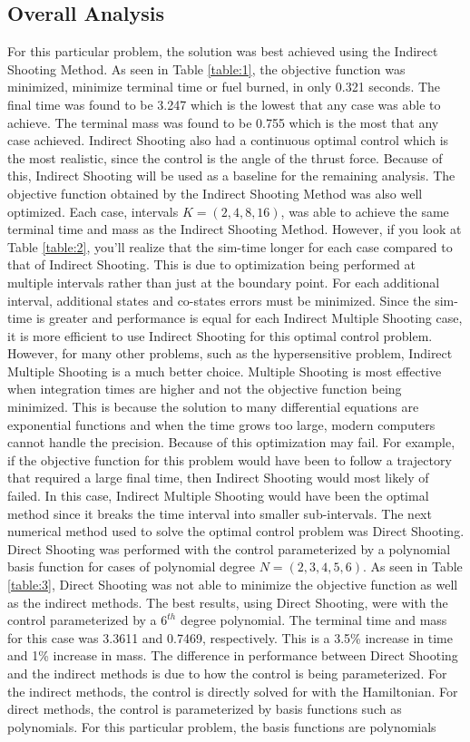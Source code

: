 \documentclass[]{article}
\begin{document}
\subsection{Overall Analysis}
For this particular problem, the solution was best achieved using the Indirect Shooting Method. As seen in Table \ref{table:1}, the objective function was minimized, minimize terminal time or fuel burned, in only 0.321 seconds. The final time was found to be 3.247 which is the lowest that any case was able to achieve. The terminal mass was found to be 0.755 which is the most that any case achieved. Indirect Shooting also had a continuous optimal control which is the most realistic, since the control is the angle of the thrust force. Because of this, Indirect Shooting will be used as a baseline for the remaining analysis. The objective function obtained by the Indirect Shooting Method was also well optimized. Each case, intervals \(K = (2,4,8,16)\), was able to achieve the same terminal time and mass as the Indirect Shooting Method. However, if you look at Table \ref{table:2}, you'll realize that the sim-time longer for each case compared to that of Indirect Shooting. This is due to optimization being performed at multiple intervals rather than just at the boundary point. For each additional interval, additional states and co-states errors must be minimized. Since the sim-time is greater and performance is equal for each Indirect Multiple Shooting case, it is more efficient to use Indirect Shooting for this optimal control problem. However, for many other problems, such as the hypersensitive problem, Indirect Multiple Shooting is a much better choice. Multiple Shooting is most effective when integration times are higher and not the objective function being minimized. This is because the solution to many differential equations are exponential functions and when the time grows too large, modern computers cannot handle the precision. Because of this optimization may fail. For example, if the objective function for this problem would have been to follow a trajectory that required a large final time, then Indirect Shooting would most likely of failed. In this case, Indirect Multiple Shooting would have been the optimal method since it breaks the time interval into smaller sub-intervals. The next numerical method used to solve the optimal control problem was Direct Shooting. Direct Shooting was performed with the control parameterized by a polynomial basis function for cases of polynomial degree \(N = (2,3,4,5,6)\). As seen in Table \ref{table:3}, Direct Shooting was not able to minimize the objective function as well as the indirect methods. The best results, using Direct Shooting, were with the control parameterized by a \(6^{th}\) degree polynomial. The terminal time and mass for this case was 3.3611 and 0.7469, respectively. This is a 3.5\% increase in time and 1\% increase in mass. The difference in performance between Direct Shooting and the indirect methods is due to how the control is being parameterized. For the indirect methods, the control is directly solved for with the Hamiltonian. For direct methods, the control is parameterized by basis functions such as polynomials. For this particular problem, the basis functions are polynomials 
\end{document}
